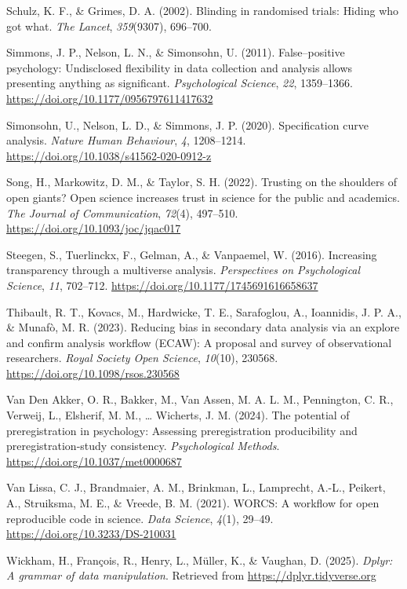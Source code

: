 \documentclass[
  english,
  man,floatsintext]{apa6}
\newlength{\cslhangindent}
\newenvironment{CSLReferences}[2] %
 {\begin{list}{}{%
  \setlength{\itemindent}{0pt}
  \setlength{\leftmargin}{0pt}
  \setlength{\parsep}{0pt}
  \ifodd #1
   \setlength{\leftmargin}{\cslhangindent}
   \setlength{\itemindent}{-1\cslhangindent}
  \fi
  \setlength{\itemsep}{#2\baselineskip}}}
 {\end{list}}
\begin{document}
\begin{CSLReferences}{1}{0}
Schulz, K. F., \& Grimes, D. A. (2002). Blinding in randomised trials: {Hiding} who got what. \emph{The Lancet}, \emph{359}(9307), 696--700.

Simmons, J. P., Nelson, L. N., \& Simonsohn, U. (2011). False--positive psychology: {U}ndisclosed flexibility in data collection and analysis allows presenting anything as significant. \emph{Psychological Science}, \emph{22}, 1359--1366. \url{https://doi.org/10.1177/0956797611417632}

Simonsohn, U., Nelson, L. D., \& Simmons, J. P. (2020). Specification curve analysis. \emph{Nature Human Behaviour}, \emph{4}, 1208--1214. \url{https://doi.org/10.1038/s41562-020-0912-z}

Song, H., Markowitz, D. M., \& Taylor, S. H. (2022). Trusting on the shoulders of open giants? Open science increases trust in science for the public and academics. \emph{The Journal of Communication}, \emph{72}(4), 497--510. \url{https://doi.org/10.1093/joc/jqac017}

Steegen, S., Tuerlinckx, F., Gelman, A., \& Vanpaemel, W. (2016). Increasing transparency through a multiverse analysis. \emph{Perspectives on Psychological Science}, \emph{11}, 702--712. \url{https://doi.org/10.1177/1745691616658637}

Thibault, R. T., Kovacs, M., Hardwicke, T. E., Sarafoglou, A., Ioannidis, J. P. A., \& Munafò, M. R. (2023). Reducing bias in secondary data analysis via an explore and confirm analysis workflow ({ECAW}): A proposal and survey of observational researchers. \emph{Royal Society Open Science}, \emph{10}(10), 230568. \url{https://doi.org/10.1098/rsos.230568}

Van Den Akker, O. R., Bakker, M., Van Assen, M. A. L. M., Pennington, C. R., Verweij, L., Elsherif, M. M., \ldots{} Wicherts, J. M. (2024). The potential of preregistration in psychology: {Assessing} preregistration producibility and preregistration-study consistency. \emph{Psychological Methods}. \url{https://doi.org/10.1037/met0000687}

Van Lissa, C. J., Brandmaier, A. M., Brinkman, L., Lamprecht, A.-L., Peikert, A., Struiksma, M. E., \& Vreede, B. M. (2021). {WORCS}: {A} workflow for open reproducible code in science. \emph{Data Science}, \emph{4}(1), 29--49. \url{https://doi.org/10.3233/DS-210031}

Wickham, H., François, R., Henry, L., Müller, K., \& Vaughan, D. (2025). \emph{Dplyr: A grammar of data manipulation}. Retrieved from \url{https://dplyr.tidyverse.org}

\end{CSLReferences}
\end{document}
